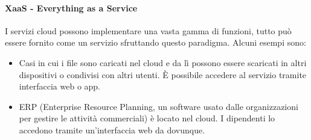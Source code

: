 \documentclass{article}
\begin{document}
\paragraph{XaaS - Everything as a Service}
I servizi cloud possono implementare una vasta gamma di funzioni, tutto può essere fornito come un servizio sfruttando questo paradigma. Alcuni esempi sono:
\begin{itemize}
    \item Casi in cui i file sono caricati nel cloud e da lì possono essere scaricati in altri dispositivi o condivisi con altri utenti. È possibile accedere al servizio tramite interfaccia web o app.
    \item ERP (Enterprise Resource Planning, un software usato dalle organizzazioni per gestire le attività commerciali) è locato nel cloud. I dipendenti lo accedono tramite un’interfaccia web da dovunque.
\end{itemize}
\end{document}
